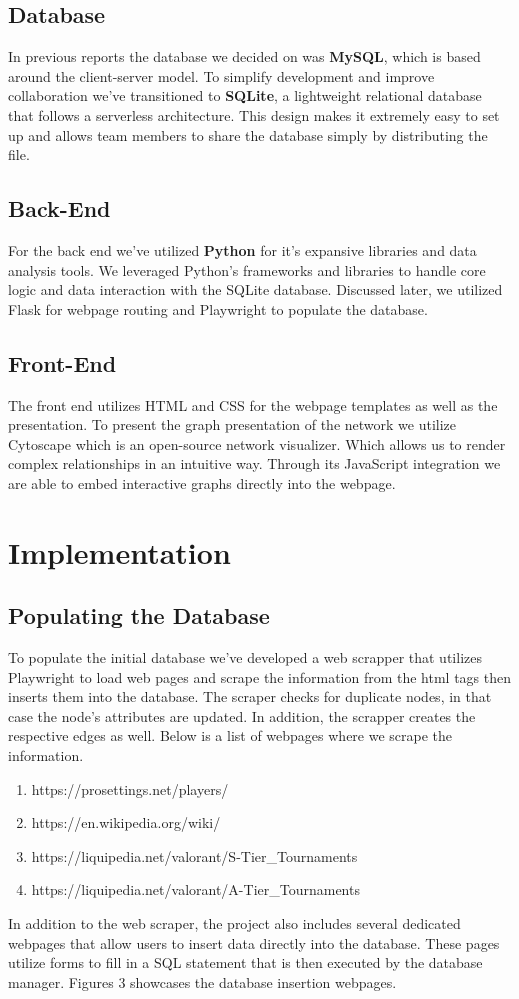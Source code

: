 \documentclass[sigconf]{acmart}
\begin{document}
\subsection{Database}
In previous reports the database we decided on was \textbf{MySQL}, which is based around the client-server model. To simplify development and improve collaboration we've transitioned to \textbf{SQLite}, a lightweight relational database that follows a serverless architecture. This design makes it extremely easy to set up and allows team members to share the database simply by distributing the file.
\subsection{Back-End}
For the back end we've utilized \textbf{Python} for it's expansive libraries and data analysis tools. We leveraged Python’s frameworks and libraries to handle core logic and data interaction with the SQLite database. Discussed later, we utilized Flask for webpage routing and Playwright to populate the database.
\subsection{Front-End}
The front end utilizes HTML and CSS for the webpage templates as well as the presentation. To present the graph presentation of the network we utilize Cytoscape which is an open-source network visualizer. Which allows us to render complex relationships in an intuitive way. Through its JavaScript integration we are able to embed interactive graphs directly into the webpage.

\section{Implementation}
\subsection{Populating the Database}
To populate the initial database we've developed a web scrapper that utilizes Playwright to load web pages and scrape the information from the html tags then inserts them into the database. The scraper checks for duplicate nodes, in that case the node's attributes are updated. In addition, the scrapper creates the respective edges as well. Below is a list of webpages where we scrape the information.

\begin{enumerate}
    \item https://prosettings.net/players/
    \item https://en.wikipedia.org/wiki/
    \item https://liquipedia.net/valorant/S-Tier\_Tournaments
    \item https://liquipedia.net/valorant/A-Tier\_Tournaments
\end{enumerate}
In addition to the web scraper, the project also includes several dedicated webpages that allow users to insert data directly into the database. These pages utilize forms to fill in a SQL statement that is then executed by the database manager. Figures 3 showcases the database insertion webpages.
\end{document}
